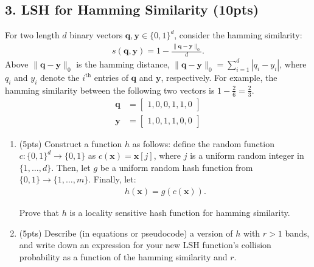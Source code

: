 \documentclass[10pt]{article}
\newcommand{\bv}[1]{\mathbf{#1}}
\begin{document}
\newpage
\subsection{3. LSH for Hamming Similarity (\textbf{\small 10pts})}
For two length $d$ binary vectors $\bv{q},\bv{y} \in \{0,1\}^d$, consider the hamming similarity: 
\begin{align*}
	s(\bv{q},\bv{y}) = 1 - \frac{\|\bv{q} - \bv{y}\|_0}{d}.
\end{align*}
Above $\|\bv{q} - \bv{y}\|_0$ is the hamming distance, $\|\bv{q} - \bv{y}\|_0 = \sum_{i=1}^d |q_i - y_i|$, where  $q_i$ and $y_i$ denote the $i^\text{th}$ entries of $\bv{q}$ and $\bv{y}$, respectively. For example, the hamming similarity between the following two vectors is $1 - \frac{2}{6} = \frac{2}{3}$.
\begin{align*}
	\bv{q} &= \begin{bmatrix}1,0,0,1,1,0\end{bmatrix} \\
	\bv{y} &= \begin{bmatrix}1,0,1,1,0,0\end{bmatrix} 
\end{align*}

\begin{enumerate}[label=(\alph*)]
	\item (5pts) 
	Construct a function $h$ as follows:
	define the random function $c: \{0,1\}^d \rightarrow \{0,1\}$ as $c(\bv{x}) = \bv{x}[j]$, where $j$ is a uniform random integer in $\{1, \ldots, d\}$. Then, let $g$ be a uniform random hash function from $\{0,1\} \rightarrow \{1, \ldots, m\}$. Finally, let:
	\begin{align*}
		h(\bv{x}) = g(c(\bv{x})).
	\end{align*}
	
	 Prove that $h$ is a locality sensitive hash function for {hamming similarity}. 
	\vspace{20em}
	
	\item (5pts) 
	Describe (in equations or pseudocode) a version of $h$ with $r > 1$ bands, and write down an expression for your new LSH function's collision probability as a function of the hamming similarity and $r$.
	\vspace{8em}
	
\end{enumerate}
\end{document}
